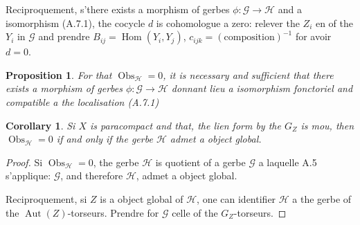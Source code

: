 \documentclass[11pt,a4paper]{article}
\theoremstyle{plain}
\newtheorem{proposition}[theorem]{Proposition}
\newtheorem{corollary}[theorem]{Corollary}
\theoremstyle{definition}
\DeclareMathOperator{\Hom}{Hom}
\DeclareMathOperator{\Aut}{Aut}
\DeclareMathOperator{\Obs}{Obs}
\begin{document}
Reciproquement, s'there exists a morphism of gerbes $\phi: \mathcal{G} \to \mathcal{H}$ and a isomorphism (A.7.1), the cocycle $d$ is cohomologue a zero: relever the $Z_{i}$ en of the $Y_{i}$ in $\mathcal{G}$ and prendre $B_{ij} = \Hom(Y_{i}, Y_{j})$, $c_{ijk} = (\text{composition})^{-1}$ for avoir $d = 0$.

\begin{proposition}
For that $\Obs_{\mathcal{H}} = 0$, it is necessary and sufficient that there exists a morphism of gerbes $\phi: \mathcal{G} \to \mathcal{H}$ donnant lieu a isomorphism fonctoriel and compatible a the localisation (A.7.1)
\end{proposition}

\begin{corollary}
Si $X$ is paracompact and that, the lien form by the $G_{Z}$ is mou,
then $\Obs_{\mathcal{H}} = 0$ if and only if the gerbe $\mathcal{H}$ admet a object global.
\end{corollary}

\begin{proof}
Si $\Obs_{\mathcal{H}} = 0$, the gerbe $\mathcal{H}$ is quotient of a gerbe $\mathcal{G}$ a laquelle A.5 s'applique:
$\mathcal{G}$, and therefore $\mathcal{H}$, admet a object global.

Reciproquement, si $Z$ is a object global of $\mathcal{H}$, one can identifier $\mathcal{H}$ a the gerbe
of the $\Aut(Z)$-torseurs. Prendre for $\mathcal{G}$ celle of the $G_{Z}$-torseurs.
\end{proof}
\end{document}
